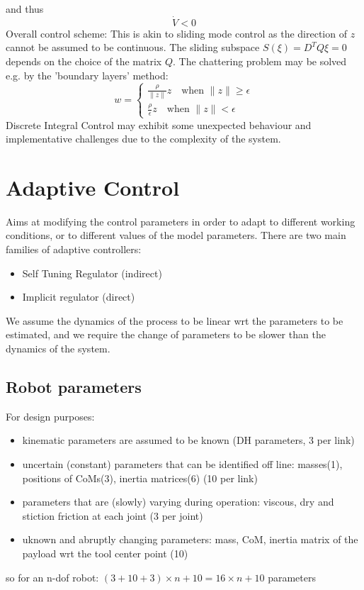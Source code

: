 \documentclass{book}
\begin{document}
and thus
\[
    \dot{V}<0
\]
Overall control scheme:
This is akin to sliding mode control as the direction of $z$ cannot be assumed to be continuous. The sliding subspace $S(\xi)=D^TQ\xi=0$ depends on the choice of the matrix $Q$. The chattering problem may be solved e.g. by the 'boundary layers' method:
\[
    w=\begin{cases}
        \displaystyle\frac{\rho}{\|z\|}z \quad \text{when }\|z\|\geq\epsilon\\
        \displaystyle\frac{\rho}{\epsilon}z \quad \text{when }\|z\|<\epsilon
    \end{cases}
\]
Discrete Integral Control may exhibit some unexpected behaviour and implementative challenges due to the complexity of the system. 


\section{Adaptive Control}
Aims at modifying the control parameters in order to adapt to different working conditions, or to different values of the model parameters.
There are two main families of adaptive controllers:
\begin{itemize}
    \item Self Tuning Regulator (indirect)
    \item Implicit regulator (direct)
\end{itemize}
We assume the dynamics of the process to be linear wrt the parameters to be estimated, and we require the change of parameters to be slower than the dynamics of the system. 
\subsection{Robot parameters}
For design purposes:
\begin{itemize}
    \item kinematic parameters are assumed to be known (DH parameters, 3 per link)
    \item uncertain (constant) parameters that can be identified off line: masses(1), positions of CoMs(3), inertia matrices(6) (10 per link)
    \item parameters that are (slowly) varying during operation: viscous, dry and stiction friction at each joint (3 per joint)
    \item uknown and abruptly changing parameters: mass, CoM, inertia matrix of the payload wrt the tool center point (10)
\end{itemize}
so for an n-dof robot: $(3+10+3)\times n +10=16\times n +10 $ parameters
\end{document}

